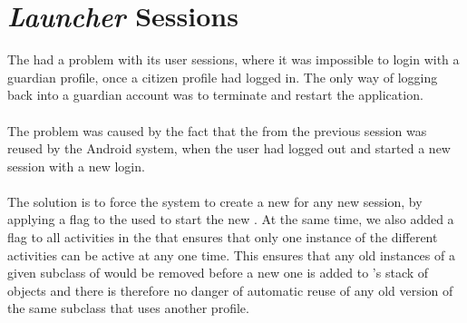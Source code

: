 
\section{\emph{Launcher} Sessions}
\label{sec:launcher_session_issues}

The \launcher had a problem with its user sessions, where it was impossible to login with a guardian profile, once a citizen profile had logged in. The only way of logging back into a guardian account was to terminate and restart the application.
\\\\
The problem was caused by the fact that the  from the previous session was reused by the Android system, when the user had logged out and started a new session with a new login.
\\\\
The solution is to force the system to create a new  for any new session, by applying a flag to the  used to start the new . At the same time, we also added a flag to all activities in the \launcher that ensures that only one instance of the different activities can be active at any one time. This ensures that any old instances of a given subclass of  would be removed before a new one is added to \launcher's stack of  objects and there is therefore no danger of automatic reuse of any old version of the same  subclass that uses another profile. 